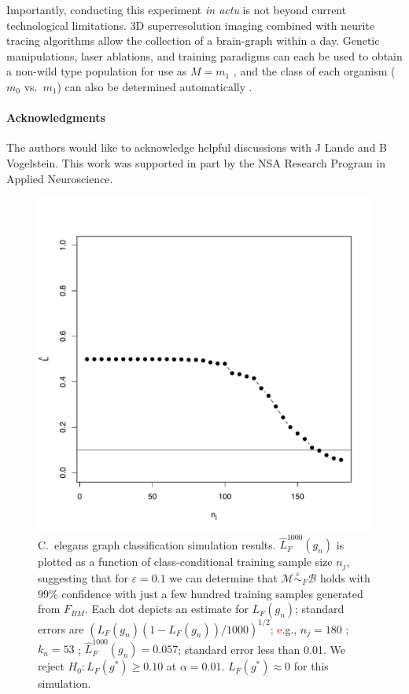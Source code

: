 \documentclass{article}
\newcommand{\mB}{\mathcal{B}}
\newcommand{\mM}{\mathcal{M}}
\newcommand{\hL}{\widehat{L}}
\newcommand{\MeB}{\mM \overset{\varepsilon}{{\sim}}_F \mB}
\providecommand{\tr}[1]{\textcolor{red}{#1}}
\begin{document}
Importantly, conducting this experiment {\it in actu} is not beyond current technological limitations. 3D superresolution imaging \cite{VaziriShank08} combined with neurite tracing algorithms \cite{HelmstaedterDenk08,Mishchenko09,LuLichtman09} allow the collection of a brain-graph within a day. Genetic manipulations, laser ablations, and training paradigms can each be used to obtain a non-wild type population for use as $M=m_1$ \cite{deBonoMaricq05}, and the class of each organism ($m_0$ vs.~$m_1$) can also be determined automatically \cite{BuckinghamSattelle08}.


\paragraph{Acknowledgments}
The authors would like to acknowledge helpful discussions with J Lande and B Vogelstein. This work was supported in part by the NSA Research Program in Applied Neuroscience.


%

% 


\begin{figure}[h!]
\centering \includegraphics[width=.9\linewidth]{Lhatplot}
\caption{C.~elegans graph classification simulation results. $\hL^{1000}_{F}(g_n)$ is plotted as a function of class-conditional training sample size $n_j$, suggesting that for $\varepsilon=0.1$ we can determine that $\MeB$ holds with $99\%$ confidence with just a few hundred training samples generated from $F_{BM}$. Each dot depicts an estimate for $L_{F}(g_n)$; standard errors are $(L_{F}(g_n)(1-L_{F}(g_n))/1000)^{1/2}$\tr{; e}.g., $n_j = 180$ ; $k_n = 53$ ; $\hL^{1000}_{F}(g_n) = 0.057$; standard error less than 0.01. We reject $H_0: L_{F}(g^*) \geq 0.10$ at $\alpha=0.01$. $L_{F}(g^*) \approx 0$ for this simulation.
}
\label{fig1}
\end{figure}
\end{document}
